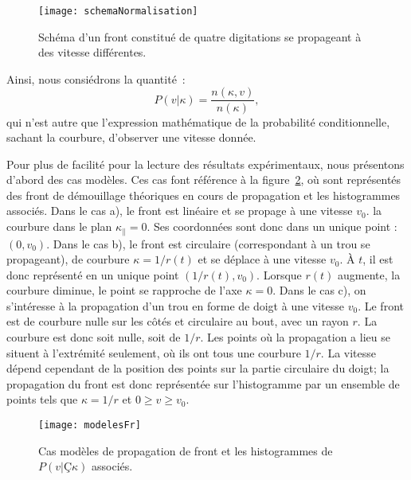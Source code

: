 \begin{figure}[!htb]
\centering
\texttt{[image: schemaNormalisation]}
\caption{Schéma d'un front constitué de quatre digitations se propageant à des vitesse différentes.}
\label{schemaNormalisation}
\end{figure}
Ainsi, nous consiédrons la quantité~:
\begin{equation}
P(v|\kappa) = \dfrac{n(\kappa,v)}{n(\kappa)},
\end{equation}
qui n'est autre que l'expression mathématique de la probabilité conditionnelle, sachant la courbure, d'observer une vitesse donnée.\par \vspace{12pt}
Pour plus de facilité pour la lecture des résultats expérimentaux, nous  présentons d'abord des cas modèles. Ces cas font référence à la figure~\ref{modelesFr}, où sont représentés des front de démouillage théoriques en cours de propagation et les histogrammes associés. Dans le cas a), le front est linéaire et se propage à une vitesse $v_0$. la courbure dans le plan $\kappa_\parallel = 0$. Ses coordonnées sont donc dans un unique point : $(0, v_0)$. Dans le cas b), le front est circulaire (correspondant à un trou se propageant), de courbure $\kappa =1/r(t)$ et se déplace à une vitesse $v_0$. À $t$, il est donc représenté en un unique point $(1/r(t), v_0)$. Lorsque $r(t)$ augmente, la courbure diminue, le point se rapproche de l’axe $\kappa = 0$. Dans le cas c), on s’intéresse à la propagation d’un trou en forme de doigt à une vitesse $v_0$. Le front est de courbure nulle sur les côtés et circulaire au bout, avec un rayon $r$. La courbure est donc soit nulle, soit de $1/r$. Les points où la propagation a lieu se situent à l’extrémité seulement, où ils ont tous une courbure $1/r$. La vitesse dépend cependant de la position des points sur la partie circulaire du doigt; la propagation du front est donc représentée sur l'histogramme par un ensemble de points tels que $\kappa = 1/r$ et $0 \geq v \geq v_0$.\par 

\begin{figure}[!htb]
\centering
\texttt{[image: modelesFr]}
\caption{Cas modèles de propagation de front et les histogrammes de $P(v|Ç\kappa)$ associés.}
\label{modelesFr}
\end{figure}

